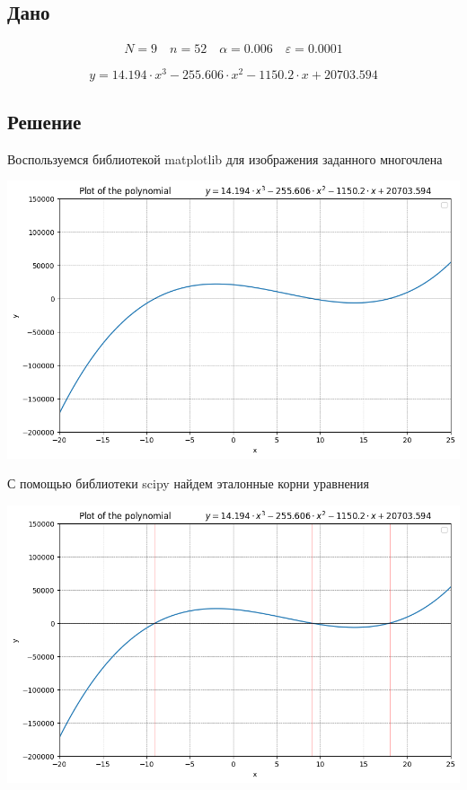 \documentclass[letterpaper, 11pt]{extarticle}
\begin{document}
\subsection*{Дано}

\begin{align*}
    N = 9
    \quad
    n = 52
    \quad
    \alpha = 0.006
    \quad
    \varepsilon = 0.0001
\end{align*}

\begin{equation*}
    y = 14.194 \cdot x^3 - 255.606 \cdot x^2 - 1150.2 \cdot x + 20703.594
\end{equation*}

\subsection*{Решение}
Воспользуемся библиотекой matplotlib для изображения заданного многочлена
\begin{center}
    \includegraphics[width=14cm]{polynomial-plot}
\end{center}

\noindent С помощью библиотеки scipy найдем эталонные корни уравнения
\begin{equation*}
    [-9.000562591621339, \quad 8.997886402334267, \quad 18.010707751918982]
\end{equation*}
\begin{center}
    \includegraphics[width=14cm]{polynomial-plot-roots}
\end{center}
\end{document}
